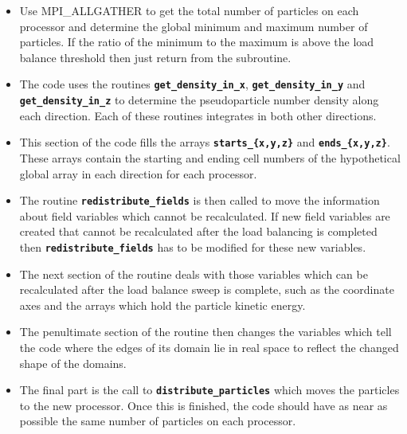 \documentclass[12pt,a4paper]{article}
\newcommand{\inlinecode}[1]{{\color{warwickred} \bf\texttt{#1}}}
\begin{document}
\begin{itemize}
\item Use MPI\_ALLGATHER to get the total number of particles on each processor
  and determine the global minimum and maximum number of particles. If the
  ratio of the minimum to the maximum is above the load balance threshold then
  just return from the subroutine.
\item The code uses the routines \inlinecode{get\_density\_in\_x},
  \inlinecode{get\_density\_in\_y} and \inlinecode{get\_density\_in\_z} to
  determine the pseudoparticle number density along each direction. Each of
  these routines integrates in both other directions.
\item This section of the code fills the arrays \inlinecode{starts\_\{x,y,z\}}
  and \inlinecode{ends\_\{x,y,z\}}. These arrays contain the starting and
  ending cell numbers of the hypothetical global array in each direction for
  each processor.
\item The routine \inlinecode{redistribute\_fields} is then called to move the
  information about field variables which cannot be recalculated. If new field
  variables are created that cannot be recalculated after the load balancing is
  completed then \inlinecode{redistribute\_fields} has to be modified for these
  new variables.
\item The next section of the routine deals with those variables which can be
  recalculated after the load balance sweep is complete, such as the coordinate
  axes and the arrays which hold the particle kinetic energy.
\item The penultimate section of the routine then changes the variables which
  tell the code where the edges of its domain lie in real space to reflect the
  changed shape of the domains.
\item The final part is the call to \inlinecode{distribute\_particles} which
  moves the particles to the new processor. Once this is
  finished, the code should have as near as possible the same number of
  particles on each processor.
\end{itemize}
\end{document}
